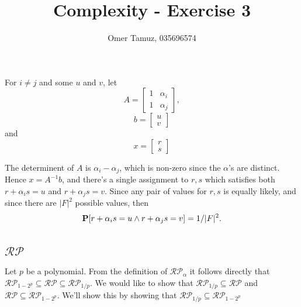 \documentclass[11pt]{article} \usepackage{amssymb}
\begin{document}
\title{Complexity - Exercise 3}

 \author{Omer Tamuz, 035696574}
\maketitle


\section{}
For $i\neq j$ and some $u$ and $v$, let 
\begin{equation*}
  A=
  \begin{bmatrix}
    1& \alpha_i\\ 
    1& \alpha_j
  \end{bmatrix},
\end{equation*}
\begin{equation*}
  b=
  \begin{bmatrix}
    u\\ 
    v
  \end{bmatrix}
\end{equation*}
and
\begin{equation*}
  x=
  \begin{bmatrix}
    r\\ 
    s
  \end{bmatrix}
\end{equation*}

The determinent of $A$ is $\alpha_i-\alpha_j$, which is
non-zero since the $\alpha$'s are distinct. Hence $x=A^{-1}b$, and there's
a single assignment to $r,s$ which satisfies both $r+\alpha_is=u$ and
$r+\alpha_js=v$. Since any pair of values for $r,s$ is equally likely, and
since there are $|F|^2$ possible values, then
$$\P[r+\alpha_is=u \wedge r+\alpha_js=v]=1/|F|^2.$$
\section{}
\subsection{$\mathcal{RP}$}
Let $p$ be a polynomial.
From the definition of $\mathcal{RP}_\alpha$ it follows directly that 
$\mathcal{RP}_{1-2^p}  \subseteq \mathcal{RP} \subseteq \mathcal{RP}_{1/p}$. 
We would like to show that 
$\mathcal{RP}_{1/p} \subseteq \mathcal{RP}$ and $\mathcal{RP} \subseteq \mathcal{RP}_{1-2^p}$. We'll show this by showing that 
$\mathcal{RP}_{1/p} \subseteq \mathcal{RP}_{1-2^p}$
\end{document}
